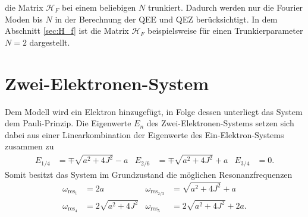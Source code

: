 die Matrix $\mathcal{H}_F$ bei
einem beliebigen $N$ trunkiert.
Dadurch werden nur die Fourier Moden bis $N$ in der
Berechnung der QEE und QEZ
berücksichtigt. In dem Abschnitt \ref{sec:H_f} ist die
Matrix $\mathcal{H}_F$  beispielsweise
für einen Trunkierparameter $N=2$ dargestellt. 


\section{Zwei-Elektronen-System}
Dem Modell wird ein Elektron
hinzugefügt, in Folge dessen
unterliegt das System dem Pauli-Prinzip.
Die Eigenwerte $E_n$ des Zwei-Elektronen-Systems
setzen sich dabei aus einer
Linearkombination der Eigenwerte
des Ein-Elektron-Systems
zusammen \cite{phillip} zu
\begin{align}
E_{1/4}&=\mp\sqrt{a^2+4J^2}-a
&E_{2/6}&=\mp\sqrt{a^2+4J^2}+a
&E_{3/4}&=0.
\end{align}
Somit besitzt das System im Grundzustand die möglichen Resonanzfrequenzen
\begin{align}
\omega_{\text{res}_1}&=2a
&\omega_{\text{res}_{2/3}}&=\sqrt{a^2+4J^2}+a \\
\omega_{\text{res}_4}&=2\sqrt{a^2+4J^2}
&\omega_{\text{res}_5}&=2\sqrt{a^2+4J^2}+2a.
\end{align}
